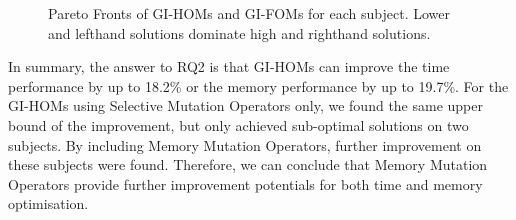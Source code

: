 \documentclass[oribibl]{llncs}
\begin{document}
{\begin{figure}[ht]
	\centering
	\vspace{-1em}
	\caption{Pareto Fronts of GI-HOMs and GI-FOMs for each subject. Lower and lefthand solutions dominate high and righthand solutions.}\label{fig_pareto}
\end{figure}

In summary, the answer to RQ2 is that GI-HOMs can improve the time performance by up to 18.2\% or the memory performance by up to 19.7\%. For the GI-HOMs using Selective Mutation Operators only, we found the same upper bound of the improvement, but only achieved sub-optimal solutions on two subjects.
By including Memory Mutation Operators, further improvement on these subjects were found.
Therefore, we can conclude that Memory Mutation Operators provide further improvement potentials for both time and memory optimisation.

}
\end{document}

